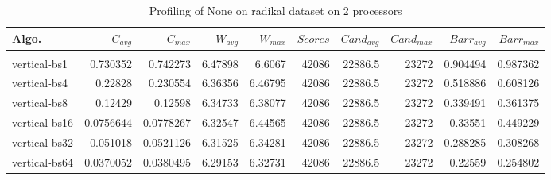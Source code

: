 \begin{table*}[htbp]
\centering
 \begin{tabular}{l r r r r r r r r r}
Algo. & $C_{avg}$ & $C_{max}$ & $W_{avg}$ & $W_{max}$ & $Scores$ & $Cand_{avg}$ & $Cand_{max}$ & $Barr_{avg}$ & $Barr_{max}$ \\
\hline \\
vertical-bs1 & 0.730352 & 0.742273 & 6.47898 & 6.6067 & 42086 & 22886.5 & 23272 & 0.904494 & 0.987362 \\
vertical-bs4 & 0.22828 & 0.230554 & 6.36356 & 6.46795 & 42086 & 22886.5 & 23272 & 0.518886 & 0.608126 \\
vertical-bs8 & 0.12429 & 0.12598 & 6.34733 & 6.38077 & 42086 & 22886.5 & 23272 & 0.339491 & 0.361375 \\
vertical-bs16 & 0.0756644 & 0.0778267 & 6.32547 & 6.44565 & 42086 & 22886.5 & 23272 & 0.33551 & 0.449229 \\
vertical-bs32 & 0.051018 & 0.0521126 & 6.31525 & 6.34281 & 42086 & 22886.5 & 23272 & 0.288285 & 0.308268 \\
vertical-bs64 & 0.0370052 & 0.0380495 & 6.29153 & 6.32731 & 42086 & 22886.5 & 23272 & 0.22559 & 0.254802 \\
 
\end{tabular}
\caption{Profiling of None on radikal dataset on 2 processors }
\label{tab:radikal:2}
\end{table*}
